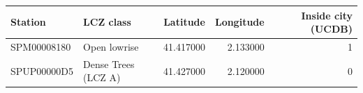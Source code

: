 \begin{tabular}{llrrr}
\toprule
Station & LCZ class & Latitude & Longitude & Inside city (UCDB) \\
\midrule
SPM00008180 & Open lowrise & 41.417000 & 2.133000 & 1 \\
SPUP00000D5 & Dense Trees (LCZ A) & 41.427000 & 2.120000 & 0 \\
\bottomrule
\end{tabular}
